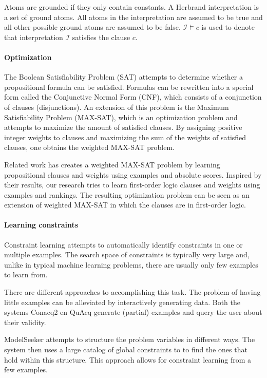 \documentclass[letterpaper]{article}
\newcommand{\sym}[1]{\ensuremath{\mathcal{#1}}}
\theoremstyle{definition}
\begin{document}
Atoms are grounded if they only contain constants.
A Herbrand interpretation is a set of ground atoms.
All atoms in the interpretation are assumed to be true and all other possible ground atoms are assumed to be false.
$\sym{I} \models c$ is used to denote that interpretation \sym{I} satisfies the clause $c$.

\paragraph{Optimization}
The Boolean Satisfiability Problem (SAT) attempts to determine whether a propositional formula can be satisfied.
Formulas can be rewritten into a special form called the Conjunctive Normal Form (CNF), which consists of a conjunction of clauses (disjunctions).
An extension of this problem is the Maximum Satisfiability Problem (MAX-SAT), which is an optimization problem and attempts to maximize the amount of satisfied clauses.
By assigning positive integer weights to clauses and maximizing the sum of the weights of satisfied clauses, one obtains the weighted MAX-SAT problem.

Related work \cite{campigotto2011active} has creates a weighted MAX-SAT problem by learning propositional clauses and weights using examples and absolute scores.
Inspired by their results, our research tries to learn first-order logic clauses and weights using examples and rankings.
The resulting optimization problem can be seen as an extension of weighted MAX-SAT in which the clauses are in first-order logic.

\paragraph{Learning constraints}
Constraint learning attempts to automatically identify constraints in one or multiple examples.
The search space of constraints is typically very large and, unlike in typical machine learning problems, there are usually only few examples to learn from.

There are different approaches to accomplishing this task.
The problem of having little examples can be alleviated by interactively generating data.
Both the systems Conacq2 \cite{bessiere2007query} en QuAcq \cite{bessiere2013constraint} generate (partial) examples and query the user about their validity.

ModelSeeker \cite{Beldiceanu:ModelSeeker} attempts to structure the problem variables in different ways.
The system then uses a large catalog of global constraints to to find the ones that hold within this structure. 
This approach allows for constraint learning from a few examples.
\end{document}
